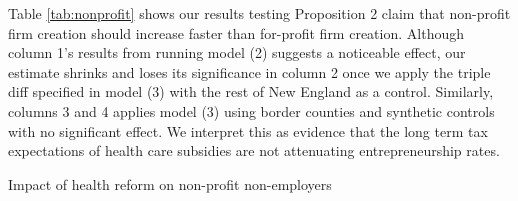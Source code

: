\documentclass[12pt]{article}
\begin{document}
Table \ref{tab:nonprofit} shows our results testing Proposition 2 claim that non-profit firm creation should increase faster than for-profit firm creation. Although column 1's results from running model (2) suggests a noticeable effect, our estimate shrinks and loses its significance in column 2 once we apply the triple diff specified in model (3) with the rest of New England as a control. Similarly, columns 3 and 4 applies model (3) using border counties and synthetic controls with no significant effect. We interpret this as evidence that the long term tax expectations of health care subsidies are not attenuating entrepreneurship rates. 

\begin{table}[H]
	\centering
	\caption{Impact of health reform on non-profit non-employers}
	
	\label{tab:nonprofit}
\end{table}

\begin{comment}

\multicolumn{4}{l}{\footnotesize Column (1) is a diff-in-diff model of non-employers per million people in Massachusetts from  }\\ 
\multicolumn{4}{l}{\footnotesize \space 2000 to 2012 with non-profit industries treated after 2007 and for-profit industries as control.}\\ 
\multicolumn{4}{l}{\footnotesize Non-profit industries defined by 4 digit NAICS codes where over half of firms were tax-exempt }\\
\multicolumn{4}{l}{\footnotesize  \space according to 2007 Economic Census data.}\\
\multicolumn{4}{l}{\footnotesize Maine, Connecticut, Vermont, Rhode Island and New Hampshire used as controls in column (2) }\\
\multicolumn{4}{l}{\footnotesize \space under triple diff model. }\\
\multicolumn{4}{l}{\footnotesize Column (3) restricts the dataset to counties that border other states across Massachusetts, }\\
\multicolumn{4}{l}{\footnotesize \space Connecticut, Vermont, Rhode Island, New Hampshire and New York. }\\
\multicolumn{4}{l}{\footnotesize Column (4) uses a synthetic control model that matches each Massachuetts industry by county }\\
\multicolumn{4}{l}{\footnotesize \space pre-trend against US counties with similar income, age, urban and insurance rate characteristics. }\\

\begin{table}[H]
	\centering
	
	\caption{Impact of health reform on non-profit entrepreneurship}
\end{table}

\end{comment}
\end{document}
